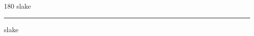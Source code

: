 
\begin{frame}
\begin{center}
\begin{turn}{180}
{\fontsize{2.5cm}{1em}\selectfont slake}
\end{turn}
\vspace{1em}\par  
\hrule
\vspace{1em}\par  
{\fontsize{2.5cm}{1em}\selectfont slake}
\end{center}
\end{frame}
